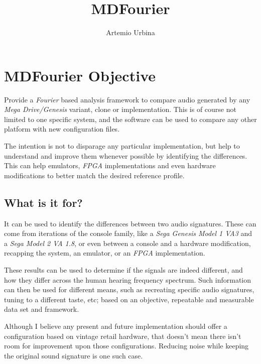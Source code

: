 \documentclass[10pt,a4paper]{report}
\title{MDFourier}
\author{Artemio Urbina}
\begin{document}
\begin{titlepage}
	\maketitle
	\thispagestyle{empty}
\end{titlepage}

\tableofcontents

\chapter{MDFourier Objective}

Provide a \textit{Fourier}\cite{FourierTransformApps} based analysis framework to compare audio generated by any \textit{Mega Drive/Genesis} variant, clone or implementation. This is of course not limited to one specific system, and the software can be used to compare any other platform with new configuration files.

The intention is not to disparage any particular implementation, but help to understand and improve them whenever possible by identifying the differences. This can help emulators, \textit{FPGA} implementations and even hardware modifications to better match the desired reference profile.

\section{What is it for?}

It can be used to identify the differences between two audio signatures. These can come from iterations of the console family, like a \textit{Sega Genesis Model 1 VA3} and a \textit{Sega Model 2 VA 1.8}, or even between a console and a hardware modification, recapping the system, an emulator, or an \textit{FPGA} implementation.

These results can be used to determine if the signals are indeed different, and how they differ across the human hearing frequency spectrum. Such information can then be used for different means, such as recreating specific audio signatures, tuning to a different taste, etc; based on an objective, repeatable and measurable data set and framework.

Although I believe any present and future implementation should offer a configuration based on vintage retail hardware, that doesn't mean there isn't room for improvement upon those configurations. Reducing noise while keeping the original sound signature is one such case.
\end{document}
